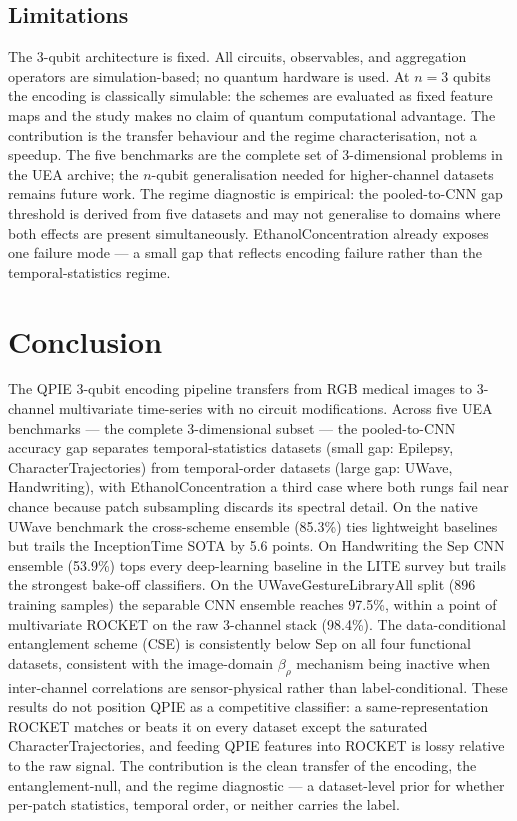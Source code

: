 \documentclass[conference,compsoc]{IEEEtran}
\begin{document}
\subsection{Limitations}

The 3-qubit architecture is fixed.
All circuits, observables, and aggregation operators are
simulation-based; no quantum hardware is used.
At $n = 3$ qubits the encoding is classically simulable: the schemes
are evaluated as fixed feature maps and the study makes no claim of
quantum computational advantage. The contribution is the transfer
behaviour and the regime characterisation, not a speedup.
The five benchmarks are the complete set of 3-dimensional problems in
the UEA archive; the $n$-qubit generalisation needed for
higher-channel datasets remains future work.
The regime diagnostic is empirical: the pooled-to-CNN gap threshold
is derived from five datasets and may not generalise to domains where
both effects are present simultaneously. EthanolConcentration already
exposes one failure mode --- a small gap that reflects encoding
failure rather than the temporal-statistics regime.

\section{Conclusion}
\label{sec:conclusion}

The QPIE 3-qubit encoding pipeline transfers from RGB medical
images to 3-channel multivariate time-series with no circuit
modifications.
Across five UEA benchmarks --- the complete 3-dimensional subset ---
the pooled-to-CNN accuracy gap separates temporal-statistics datasets
(small gap: Epilepsy, CharacterTrajectories) from temporal-order
datasets (large gap: UWave, Handwriting), with EthanolConcentration a
third case where both rungs fail near chance because patch subsampling
discards its spectral detail.
On the native UWave benchmark the cross-scheme ensemble (85.3\%)
ties lightweight baselines but trails the InceptionTime SOTA by
5.6 points.
On Handwriting the Sep CNN ensemble (53.9\%) tops every deep-learning
baseline in the LITE survey but trails the strongest bake-off
classifiers.
On the UWaveGestureLibraryAll split (896 training samples) the
separable CNN ensemble reaches 97.5\%, within a point of multivariate
ROCKET on the raw 3-channel stack (98.4\%).
The data-conditional entanglement scheme (CSE) is consistently below
Sep on all four functional datasets, consistent with the image-domain
$\beta_\rho$ mechanism being inactive when inter-channel correlations
are sensor-physical rather than label-conditional.
These results do not position QPIE as a competitive classifier: a
same-representation ROCKET matches or beats it on every dataset except
the saturated CharacterTrajectories, and feeding QPIE features into
ROCKET is lossy relative to the raw signal. The contribution is the
clean transfer of the encoding, the entanglement-null, and the regime
diagnostic --- a dataset-level prior for whether per-patch statistics,
temporal order, or neither carries the label.
\end{document}
